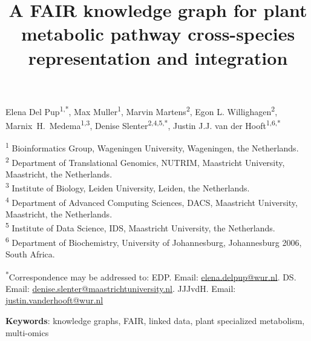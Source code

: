 \documentclass[11pt,a4paper]{article}
\title{\vspace{-2em}\bfseries A FAIR knowledge graph for plant metabolic pathway cross-species
representation and integration}
\date{}
\begin{document}


\maketitle
\vspace{-3em}

\begin{center}
Elena Del Pup\textsuperscript{1,*},
Max Muller\textsuperscript{1},
Marvin Martens\textsuperscript{2},
Egon L. Willighagen\textsuperscript{2},
Marnix~H.~Medema\textsuperscript{1,3},
Denise Slenter\textsuperscript{2,4,5,*},
Justin J.J. van der Hooft\textsuperscript{1,6,*}
\end{center}

\vspace{0.5em}
\noindent\footnotesize
\textsuperscript{1} Bioinformatics Group, Wageningen University, Wageningen, the Netherlands.\\
\textsuperscript{2} Department of Translational Genomics, NUTRIM, Maastricht University, Maastricht, the Netherlands.\\
\textsuperscript{3} Institute of Biology, Leiden University, Leiden, the Netherlands.\\
\textsuperscript{4} Department of Advanced Computing Sciences, DACS, Maastricht University, Maastricht, the Netherlands.\\
\textsuperscript{5} Institute of Data Science, IDS, Maastricht University, the Netherlands.\\
\textsuperscript{6} Department of Biochemistry, University of Johannesburg, Johannesburg 2006, South Africa.

\vspace{0.5em}
\noindent\textsuperscript{*}Correspondence may be addressed to: EDP. Email: \href{mailto:elena.delpup@wur.nl}{elena.\allowbreak{}delpup@\allowbreak{}wur.nl}.
DS. Email: \href{mailto:denise.slenter@maastrichtuniversity.nl}{denise.\allowbreak{}slenter@\allowbreak{}maastrichtuniversity.\allowbreak{}nl}.
JJJvdH. Email: \href{mailto:justin.vanderhooft@wur.nl}{justin.vanderhooft@wur.nl}
\normalsize

\vspace{1em}
\noindent\textbf{Keywords}: knowledge graphs, FAIR, linked data, plant specialized metabolism, multi-omics
\end{document}
